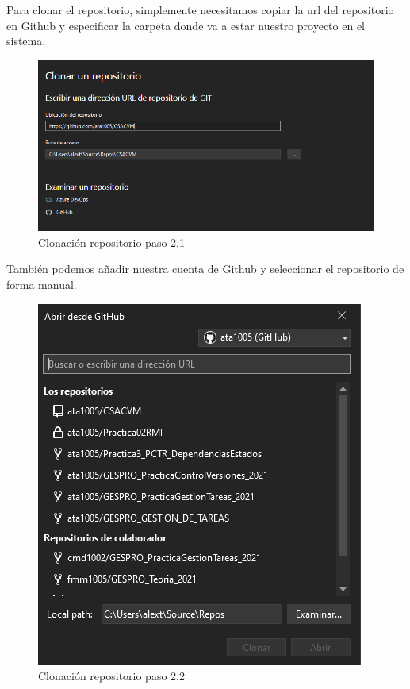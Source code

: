 Para clonar el repositorio, simplemente necesitamos copiar la url del repositorio en Github y especificar la carpeta donde va a estar nuestro proyecto en el sistema.

\begin{figure}
    \centering
    \includegraphics[width=\linewidth]{img/ManualProgramador/ClonacionP2.png}
    \caption{Clonación repositorio paso 2.1}
    
\end{figure}

También podemos añadir nuestra cuenta de Github y seleccionar el repositorio de forma manual.

\begin{figure}
    \centering
    \includegraphics[width=\linewidth]{img/ManualProgramador/ClonacionP3.png}
    \caption{Clonación repositorio paso 2.2}
    
\end{figure}

